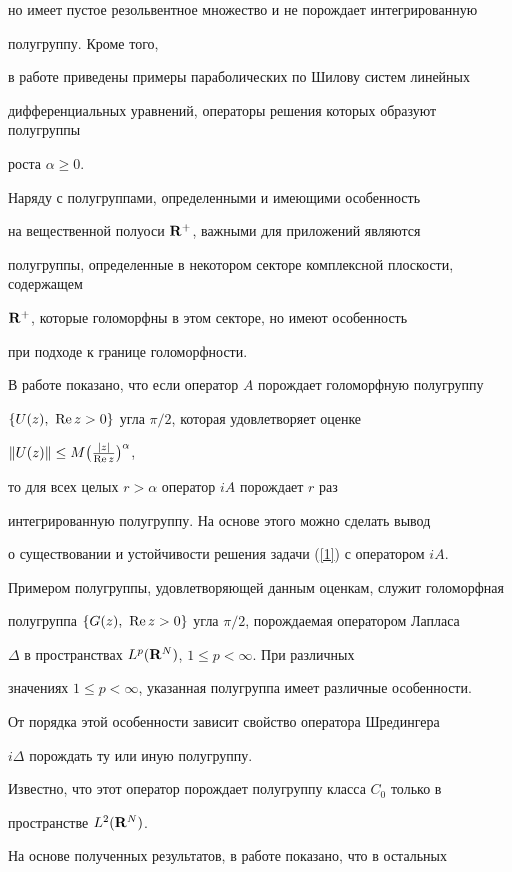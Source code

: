 но имеет пустое резольвентное множество и не порождает интегрированную


полугруппу. Кроме того, 


в работе приведены примеры параболических по Шилову систем линейных


дифференциальных уравнений, операторы решения которых образуют полугруппы


роста $\alpha\geq 0$.





Наряду с полугруппами, определенными и имеющими особенность


на вещественной полуоси $\bold R^+$, важными для приложений являются


полугруппы, определенные в некотором секторе комплексной плоскости, содержащем


$\bold R^+$, которые голоморфны в этом секторе, но имеют особенность 


при подходе к границе голоморфности.


В работе показано, что если оператор $A$ порождает голоморфную полугруппу


$\{U(z),\ \operatorname{Re} z>0\}$ угла $\pi/2$, которая удовлетворяет оценке


$\|U(z)\| \leq M\big(\frac{|z|}{\operatorname{Re} z} \big)^{\alpha}$,


то для всех целых $r>\alpha$ оператор $iA$ порождает $r$ раз


интегрированную полугруппу. На основе этого можно сделать вывод


о существовании и устойчивости решения задачи (\ref{1}) с оператором $iA$.


Примером полугруппы, удовлетворяющей данным оценкам, служит голоморфная


полугруппа $\{G(z),\ \operatorname{Re} z>0\}$ угла $\pi/2$, порождаемая оператором Лапласа


$\Delta$ в пространствах $L^p(\bold R^N)$, $1\leq p< \infty$. При различных


значениях $1\leq p <\infty$, указанная полугруппа имеет различные особенности.


От порядка этой особенности зависит свойство оператора Шредингера


$i\Delta$ порождать ту или иную полугруппу.


Известно, что этот оператор порождает полугруппу класса $C_0$ только в


пространстве $L^2(\bold R^N)$.


На основе полученных результатов, в работе показано, что в остальных


